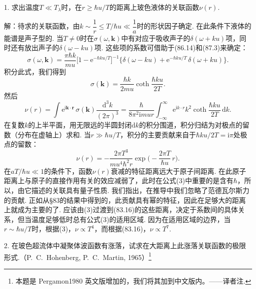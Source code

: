 \begin{xiti}

1. 求出温度$T\ll T_{\lambda}$时，在$r\geqslant\hbar u/T$的距离上玻色液体的关联函数$\nu(r)$.

{\heiti 解：}待求的关联函数，由$k\sim\dfrac{1}{r}\leqslant T/\hbar u\ll\dfrac{1}{a}$时的形状因子确定. 在此条件下液体的能谱是声子型的. 当$T\neq0$时在$\sigma(\omega,\bm{k})$中有对应于吸收声子的$\delta(\omega+ku)$项，同时还有放出声子的$\delta(\omega-ku)$项. 这些项的系数可借助于(86.14)和(87.3)来确定：
\begin{equation}\tag{1}
\sigma(\omega,\bm{k})=\frac{\pi\hbar k}{mu}\bigl[1-\mathrm{e}^{-\hbar ku/T}\bigr]^{-1}\bigl\{\delta(\omega-ku)+\mathrm{e}^{-\hbar ku/T}\,\delta(\omega+ku)\bigr\}.
\end{equation}
积分此式，我们得到
\begin{equation}\tag{2}
\sigma(\bm{k})=\frac{\hbar k}{2mu}\coth\frac{\hbar ku}{2T}.
\end{equation}
然后
\begin{equation*}
\nu(r)=\int\mathrm{e}^{\mathrm{i}\bm{k}\cdot\bm{r}}\,\sigma(\bm{k})\frac{\mathrm{d}^{3}k}{(2\pi)^{3}}=\frac{\hbar}{8\pi^{2}\mathrm{i}mur}\int_{-\infty}^{\infty}\mathrm{e}^{\mathrm{i}k\cdot r}k^{2}\coth\frac{\hbar ku}{2T}\,\mathrm{d}k.
\end{equation*}
在复数$k$的上半平面，用无限远的半圆封闭$\mathrm{d}k$的积分围道，积分归结为对极点的留数（分布在虚轴上）求和. 当$r\gg\hbar u/T$，积分的主要贡献来自于$\hbar ku/2T=\mathrm{i}\pi$处极点的留数：
\begin{equation}\tag{3}
\nu(r)=-\frac{2\pi T^{3}}{mu^{4}\hbar^{2}r}\exp\biggl(-\frac{2\pi T}{\hbar u}\,r\biggr).
\end{equation}
在$aT/\hbar u\ll1$的条件下，函数$\nu(r)$衰减的特征距离远大于原子间距离. 在此原子距离上与原子的直接作用有关的效应减弱了，此时在公式(3)中重要的是含有$\hbar$，所以，由它描述的关联具有量子性质. 我们指出，在推导中我们忽略了范德瓦尔斯力的贡献. 正如从§83的结果中得到的，此贡献具有幂的特征，因此在足够大的距离上就成为主要的了. 应该由(3)过渡到(83.16)的这些距离，决定于系数间的具体关系，但当温度足够低时总有公式(3)的适用区域. 因为在适用区域的边界，当$r\sim\hbar u/T$时，根据(3)，$\nu\propto T^{4}$，而根据(83.16)，$\nu\propto T^{7}$.

2. 在玻色超流体中凝聚体波函数有涨落，试求在大距离上此涨落关联函数的极限形式.\allowbreak（P.~C.~Hohenberg, P.~C.~Martin, 1965）\footnote{本题是 Pergamon1980 英文版增加的，我们将其加到中文版内。——译者注.}


\end{xiti}
